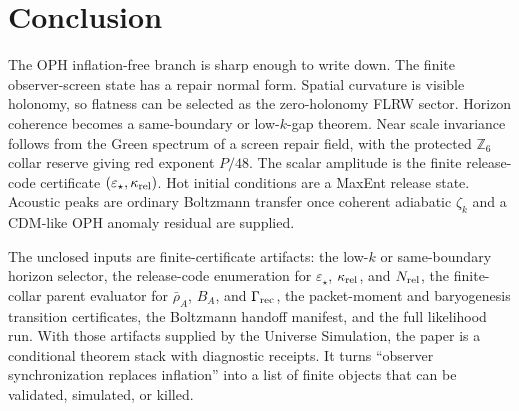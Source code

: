 \documentclass[11pt]{article}
\newcommand{\Zsix}{\mathbb Z_6}
\begin{document}
\section{Conclusion}

The OPH inflation-free branch is sharp enough to write down. The finite observer-screen state has a
repair normal form. Spatial curvature is visible holonomy, so flatness can be selected as the
zero-holonomy FLRW sector. Horizon coherence becomes a same-boundary or low-\(k\)-gap theorem.
Near scale invariance follows from the Green spectrum of a screen repair field, with the protected
\(\Zsix\) collar reserve giving red exponent \(P/48\). The scalar amplitude is the finite
release-code certificate \((\varepsilon_\star,\kappa_{\rm rel})\). Hot initial conditions are a
MaxEnt release state. Acoustic peaks are
ordinary Boltzmann transfer once coherent adiabatic \(\zeta_k\) and a CDM-like OPH anomaly residual
are supplied.

The unclosed inputs are finite-certificate artifacts: the low-\(k\) or same-boundary horizon
selector, the release-code enumeration for \(\varepsilon_\star\), \(\kappa_{\rm rel}\), and
\(N_{\rm rel}\), the finite-collar parent evaluator for \(\bar\rho_A\), \(B_A\), and
\(\Gamma_{\rm rec}\), the packet-moment and baryogenesis transition certificates, the Boltzmann
handoff manifest, and the full likelihood run. With those artifacts supplied by the Universe
Simulation, the paper is a conditional theorem stack with diagnostic receipts. It turns ``observer
synchronization replaces inflation'' into a list of finite objects that can be validated,
simulated, or killed.
\end{document}
